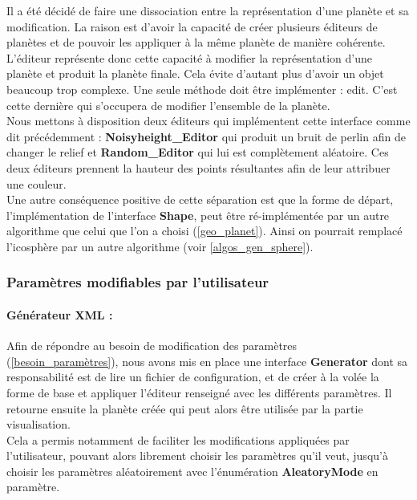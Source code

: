 \documentclass[a4paper]{article}
\begin{document}
Il a été décidé de faire une dissociation entre la représentation d'une planète et sa modification. La raison est d'avoir la capacité de créer plusieurs éditeurs de planètes et de pouvoir les appliquer à la même planète de manière cohérente. L'éditeur représente donc cette capacité à modifier la représentation d'une planète et produit la planète finale. Cela évite d'autant plus d'avoir un objet beaucoup trop complexe. Une seule méthode doit être implémenter : edit. C'est cette dernière qui s'occupera de modifier l'ensemble de la planète.\\
Nous mettons à disposition deux éditeurs qui implémentent cette interface comme dit précédemment : \textbf{Noisyheight\_Editor} qui produit un bruit de perlin afin de changer le relief et \textbf{Random\_Editor} qui lui est complètement aléatoire. Ces deux éditeurs prennent la hauteur des points résultantes afin de leur attribuer une couleur.\\
Une autre conséquence positive de cette séparation est que la forme de départ, l'implémentation de l'interface \textbf{Shape}, peut être ré-implémentée par un autre algorithme que celui que l'on a choisi (\ref{geo_planet}). Ainsi on pourrait remplacé l'icosphère par un autre algorithme (voir \ref{algos_gen_sphere}).\\

\subsubsection{Paramètres modifiables par l'utilisateur}

\paragraph{Générateur XML :}

Afin de répondre au besoin de modification des paramètres (\ref{besoin_paramètres}), nous avons mis en place une interface \textbf{Generator} dont sa responsabilité est de lire un fichier de configuration, et de créer à la volée la forme de base et appliquer l'éditeur renseigné avec les différents paramètres.
Il retourne ensuite la planète créée qui peut alors être utilisée par la partie visualisation.\\
Cela a permis notamment de faciliter les modifications appliquées par l'utilisateur, pouvant alors librement choisir les paramètres qu'il veut, jusqu'à choisir les paramètres aléatoirement avec l'énumération \textbf{AleatoryMode} en paramètre.
\end{document}
